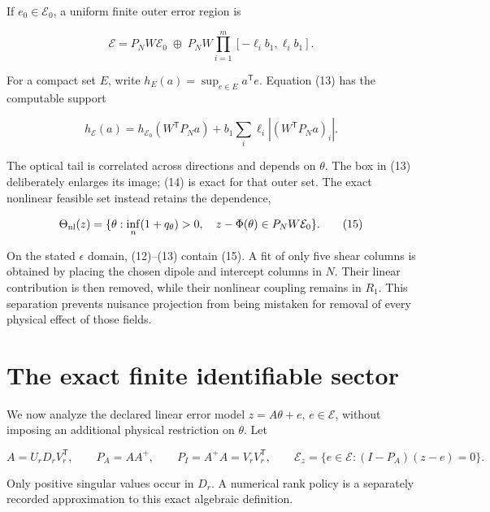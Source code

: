 \documentclass[aps,prd,reprint,onecolumn,11pt,nofootinbib,notitlepage]{revtex4-2}
\begin{document}
If \(e_0\in\mathcal E_0\), a uniform finite outer error region is

\begin{equation}
 \mathcal E=P_NW\mathcal E_0\;\oplus\;
 P_NW\prod_{i=1}^m[-\ell_i b_1,\ell_i b_1].\tag{13}
\end{equation}

For a compact set \(E\), write \(h_E(a)=\sup_{e\in E}a^{\mathsf T}e\). Equation (13) has the computable support

\begin{equation}
 h_{\mathcal E}(a)=h_{\mathcal E_0}(W^{\mathsf T}P_Na)
 +b_1\sum_i\ell_i|(W^{\mathsf T}P_Na)_i| .\tag{14}
\end{equation}

The optical tail is correlated across directions and depends on \(\theta\). The box in (13) deliberately enlarges its image; (14) is exact for that outer set. The exact nonlinear feasible set instead retains the dependence,

\begin{equation}
 \Theta_{\rm nl}(z)=
 \{\theta:\inf_n(1+q_\theta)>0,\quad
 z-\Phi(\theta)\in P_NW\mathcal E_0\}.\tag{15}
\end{equation}

On the stated \(\epsilon\) domain, (12)--(13) contain (15). A fit of only five shear columns is obtained by placing the chosen dipole and intercept columns in \(N\). Their linear contribution is then removed, while their nonlinear coupling remains in \(R_1\). This separation prevents nuisance projection from being mistaken for removal of every physical effect of those fields.

\section{The exact finite identifiable sector}

We now analyze the declared linear error model \(z=A\theta+e\), \(e\in\mathcal E\), without imposing an additional physical restriction on \(\theta\). Let

\begin{equation}
 A=U_r D_r V_r^{\mathsf T},\qquad
 P_A=AA^+,\qquad P_I=A^+A=V_rV_r^{\mathsf T},\qquad
 \mathcal E_z=\{e\in\mathcal E:(I-P_A)(z-e)=0\}.\tag{16}
\end{equation}

Only positive singular values occur in \(D_r\). A numerical rank policy is a separately recorded approximation to this exact algebraic definition.
\end{document}
